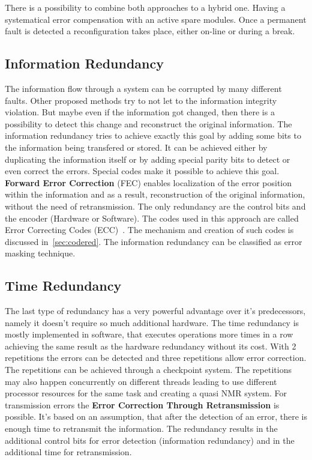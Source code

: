 There is a possibility to combine both approaches to a hybrid one. Having a systematical error compensation with an active spare modules. Once a permanent fault is detected a reconfiguration takes place, either on-line or during a break.

\subsection{Information Redundancy}\label{ssec:Infred}
The information flow through a system can be corrupted by many different faults. Other proposed methods try to not let to the information integrity violation. But maybe even if the information got changed, then there is a possibility to detect this change and reconstruct the original information. The information redundancy tries to achieve exactly this goal by adding some bits to the information being transfered or stored. It can be achieved either by duplicating the information itself or by adding special parity bits to detect or even correct the errors. Special codes make it possible to achieve this goal.
\textbf{Forward Error Correction} (FEC) enables localization of the error position within the information and as a result, reconstruction of the original information, without the need of retransmission. The only redundancy are the control bits and the encoder (Hardware or Software). The codes used in this approach are called Error Correcting Codes (ECC)~\cite{book:SchonfeldKlimant}. The mechanism and creation of such codes is discussed in~\autoref{sec:codered}. The information redundancy can be classified as error masking technique.\\

\subsection{Time Redundancy}
The last type of redundancy has a very powerful advantage over it's predecessors, namely it doesn't require so much additional hardware. The time redundancy is mostly implemented in software, that executes operations more times in a row achieving the same result as the hardware redundancy without its cost. With 2 repetitions the errors can be detected and three repetitions allow error correction. The repetitions can be achieved through a checkpoint system. The repetitions may also happen concurrently on different threads leading to use different processor resources for the same task and creating a quasi NMR system. For transmission errors the \textbf{Error Correction Through Retransmission} is possible. It's based on an assumption, that after the detection of an error, there is enough time to retransmit the information. The redundancy results in the additional control bits for error detection (information redundancy) and in the additional time for retransmission.


